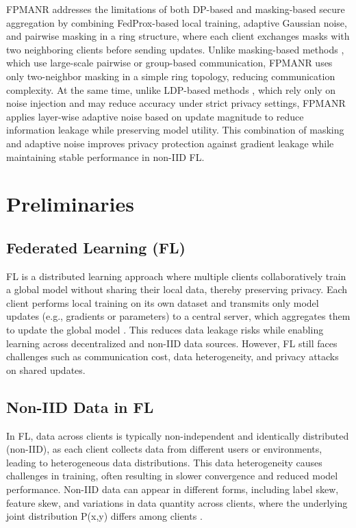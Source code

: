 \documentclass[a4paper,fleqn]{cas-dc}
\begin{document}
FPMANR addresses the limitations of both DP-based and masking-based secure aggregation by combining FedProx-based local training, adaptive Gaussian noise, and pairwise masking in a ring structure, where each client exchanges masks with two neighboring clients before sending updates. Unlike masking-based methods \citep{bonawitz2017practical,cui2025aldp}, which use large-scale pairwise or group-based communication, FPMANR uses only two-neighbor masking in a simple ring topology, reducing communication complexity. At the same time, unlike LDP-based methods \citep{niu2025adaptive,truex2020ldp}, which rely only on noise injection and may reduce accuracy under strict privacy settings, FPMANR applies layer-wise adaptive noise based on update magnitude to reduce information leakage while preserving model utility. This combination of masking and adaptive noise improves privacy protection against gradient leakage while maintaining stable performance in non-IID FL.

\section{Preliminaries}
\label{sec:3}

\subsection{Federated Learning (FL)}

FL is a distributed learning approach where multiple clients collaboratively train a global model without sharing their local data, thereby preserving privacy. Each client performs local training on its own dataset and transmits only model updates (e.g., gradients or parameters) to a central server, which aggregates them to update the global model \citep{wen2023survey}. This reduces data leakage risks while enabling learning across decentralized and non-IID data sources. However, FL still faces challenges such as communication cost, data heterogeneity, and privacy attacks on shared updates.

\subsection{Non-IID Data in FL}

In FL, data across clients is typically non-independent and identically distributed (non-IID), as each client collects data from different users or environments, leading to heterogeneous data distributions. This data heterogeneity causes challenges in training, often resulting in slower convergence and reduced model performance. Non-IID data can appear in different forms, including label skew, feature skew, and variations in data quantity across clients, where the underlying joint distribution P(x,y) differs among clients \citep{li2022federated}.
\end{document}
